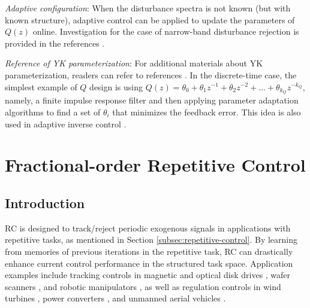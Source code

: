 \documentclass [11pt, proquest] {uwthesis}[2020/02/24]
\begin{document}
\emph{Adaptive configuration}: When the disturbance spectra is not
known (but with known structure), adaptive control can be applied
to update the parameters of $Q(z)$ online. Investigation for the
case of narrow-band disturbance rejection is provided in the references
\cite{XuChen_TCST2012,chen2010unknown}.

\emph{Reference of YK parameterization}: For additional materials
about YK parameterization, readers can refer to references \cite{landau2005adaptive,doyle2013feedback,ANDERSON19981485}.
In the discrete-time case, the simplest example of $Q$ design is
using $Q(z)=\theta_{0}+\theta_{1}z^{-1}+\theta_{2}z^{-2}+...+\theta_{k_{Q}}z^{-k_{Q}}$,
namely, a finite impulse response filter and then applying parameter
adaptation algorithms to find a set of $\theta_{i}$ that minimizes
the feedback error. This idea is also used in adaptive inverse control
\cite{Widrow2007}.


\chapter{Fractional-order Repetitive Control} \label{chap:Fractional-RC}

\section{Introduction} \label{sec:Fractional-RC-Introduction}

RC \cite{inoue1981highpower} is designed to
track/reject periodic exogenous signals in applications with repetitive
tasks, as mentioned in Section \ref{subsec:repetitive-control}. By learning from memories of previous iterations in the repetitive
task, RC can drastically enhance current control performance in the
structured task space. Application examples include tracking controls
in magnetic and optical disk drives \cite{chew1989digital,doh2006design},
wafer scanners \cite{XuChen_TCST_RC2013}, and robotic manipulators
\cite{cosner1990plug,meng2017robust}, as well as regulation controls
in wind turbines \cite{navalkar2014subspace,castro2017variable},
power converters \cite{nazir2015analysis}, and unmanned aerial vehicles
\cite{he2017repetitive}.
\end{document}

